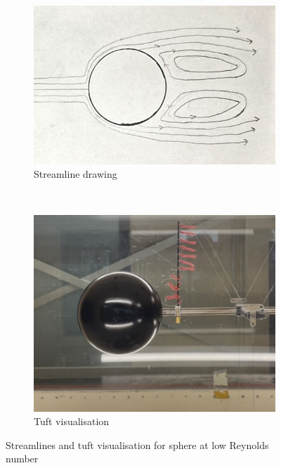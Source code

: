\documentclass[8pt]{article}
\begin{document}
\begin{figure}[H]
    \centering
    \begin{subfigure}[t]{0.48\textwidth}
        \centering
        \includegraphics[width=1\textwidth]{Images_Videos/stream_low_Re_sphere.jpg}
        \caption{Streamline drawing}
        \label{fig:figure6}
    \end{subfigure}
    ~
    \begin{subfigure}[t]{0.48\textwidth}
        \centering
        \includegraphics[width=1\textwidth]{Images_Videos/sphere_low_Re.jpg}
        \caption{Tuft visualisation}
        \label{fig:figure7}
    \end{subfigure}
    \caption{Streamlines and tuft visualisation for sphere at low Reynolds number}
\end{figure}
\end{document}
